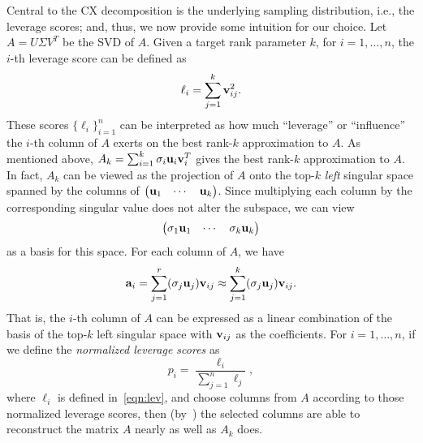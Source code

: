 Central to the CX decomposition is the underlying sampling distribution, i.e., the leverage scores; and, thus, we now provide some intuition for our choice.
Let $A=U\Sigma V^T$ be the SVD of $A$.
Given a target rank parameter $k$, for $i=1,\ldots,n$, the $i$-th leverage score can be defined as
\begin{equation}
 \label{eqn:lev}
  \ell_i = \sum_{j=1}^k \v_{ij}^2.
\end{equation}
These scores $\{\ell_i\}_{i=1}^{n}$ can be interpreted as how much ``leverage'' or ``influence'' the $i$-th column of $A$ exerts on the best rank-$k$ approximation to $A$. 
As mentioned above, $A_k = \sum_{i=1}^k \sigma_i \mathbf{u}_i \mathbf{v}_i^T$ gives the best rank-$k$ approximation to $A$.
In fact, $A_k$ can be viewed as the projection of $A$ onto the top-$k$ \emph{left} singular space spanned by the columns of $\begin{pmatrix} \mathbf{u}_1 & \cdots & \mathbf{u}_k \end{pmatrix}$.
Since multiplying each column by the corresponding singular value does not alter the subspace, we can view
$$
\begin{pmatrix} \sigma_1 \mathbf{u}_1 & \cdots & \sigma_k \mathbf{u}_k \end{pmatrix}
$$ 
as a basis for this space.  
For each column of $A$, we have 
  $$  \mathbf{a}_i = \sum_{j=1}^{r} (\sigma_j \mathbf{u}_j) \mathbf{v}_{ij} \approx \sum_{j=1}^k (\sigma_j \mathbf{u}_j) \mathbf{v}_{ij}.  $$
That is, the $i$-th column of $A$ can be expressed as a linear combination of the basis of the top-$k$ left singular space with $\mathbf{v}_{ij}$ as the coefficients.
For $i=1,\ldots,n$, if we define the {\it normalized leverage scores} as
\begin{equation}
\label{eqn:nlev}
  p_i = \frac{\ell_i}{\sum_{j=1}^n \ell_j},
\end{equation}      
where $\ell_i$ is defined in~\eqref{eqn:lev}, and choose columns from $A$ according to those normalized leverage scores, then (by~\cite{DMM08,CUR_PNAS}) the selected columns are able to reconstruct the matrix $A$ nearly as well as $A_k$ does.

